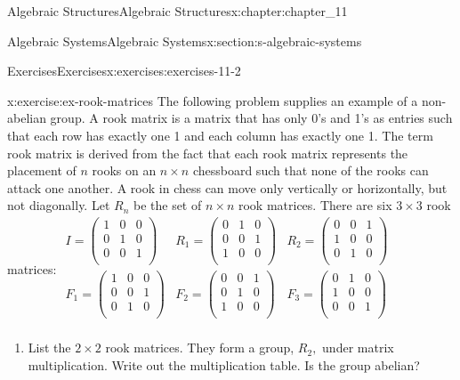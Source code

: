 \documentclass[twoside,10pt,]{book}
\numberwithin{equation}{section}
\begin{document}
\begin{chapterptx}{Algebraic Structures}{}{Algebraic Structures}{}{}{x:chapter:chapter_11}
\begin{sectionptx}{Algebraic Systems}{}{Algebraic Systems}{}{}{x:section:s-algebraic-systems}
\begin{exercises-subsection}{Exercises}{}{Exercises}{}{}{x:exercises:exercises-11-2}
\begin{divisionexercise}{5}{}{}{x:exercise:ex-rook-matrices}
The following problem supplies an example of a non-abelian group. A rook matrix is a matrix that has only 0's and 1's as entries such that each row has exactly one 1 and each column has exactly one 1. The term rook matrix is derived from the fact that each rook matrix represents the placement of \(n\) rooks on an \(n\times n\) chessboard such that none of the rooks can attack one another. A rook in chess can move only vertically or horizontally, but not diagonally. Let \(R_n\) be the set of \(n\times n\) rook matrices. There are six \(3\times 3\) rook matrices: \(\begin{array}{ccc}
I=\left(
\begin{array}{ccc}
1 & 0 & 0 \\
0 & 1 & 0 \\
0 & 0 & 1 \\
\end{array}
\right) & R_1=\left(
\begin{array}{ccc}
0 & 1 & 0 \\
0 & 0 & 1 \\
1 & 0 & 0 \\
\end{array}
\right) & R_2=\left(
\begin{array}{ccc}
0 & 0 & 1 \\
1 & 0 & 0 \\
0 & 1 & 0 \\
\end{array}
\right) \\
F_1=\left(
\begin{array}{ccc}
1 & 0 & 0 \\
0 & 0 & 1 \\
0 & 1 & 0 \\
\end{array}
\right) & F_2=\left(
\begin{array}{ccc}
0 & 0 & 1 \\
0 & 1 & 0 \\
1 & 0 & 0 \\
\end{array}
\right) & F_3=\left(
\begin{array}{ccc}
0 & 1 & 0 \\
1 & 0 & 0 \\
0 & 0 & 1 \\
\end{array}
\right) \\
\end{array}\)%
\begin{enumerate}[label=(\alph*)]
\item{}List the \(2\times 2\) rook matrices. They form a group, \(R_2,\) under matrix multiplication. Write out the multiplication table. Is the group abelian?%

\end{enumerate}
\end{divisionexercise}
\end{exercises-subsection}
\end{sectionptx}
\end{chapterptx}
\end{document}
